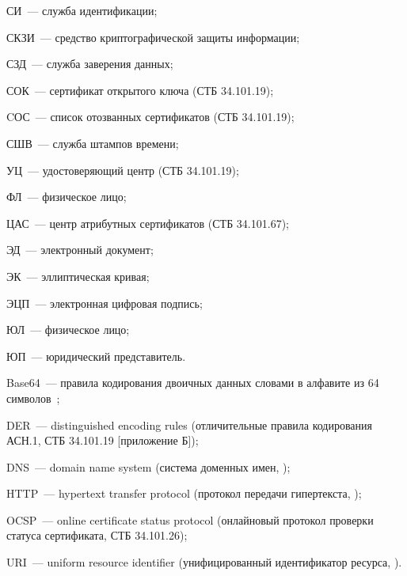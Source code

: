 СИ~--- служба идентификации;

СКЗИ~--- средство криптографической защиты информации;

СЗД~--- служба заверения данных;

СОК~--- сертификат открытого ключа (СТБ 34.101.19);

CОС~--- список отозванных сертификатов (СТБ 34.101.19);

СШВ~--- служба штампов времени;

УЦ~--- удостоверяющий центр (СТБ 34.101.19);

ФЛ~--- физическое лицо;

ЦАС~--- центр атрибутных сертификатов (СТБ 34.101.67);

ЭД~--- электронный документ;

ЭК~--- эллиптическая кривая;

ЭЦП~--- электронная цифровая подпись;

ЮЛ~--- физическое лицо;

ЮП~--- юридический представитель.

Base64~--- правила кодирования двоичных данных словами в алфавите из 64 
символов~\cite{BASE64};

DER~--- distinguished encoding rules (отличительные правила кодирования АСН.1, 
СТБ 34.101.19 [приложение Б]);

DNS~--- domain name system (система доменных имен, \cite{DNS});

HTTP~--- hypertext transfer protocol (протокол передачи гипертекста, 
\cite{HTTP});

OCSP~--- online certificate status protocol (онлайновый протокол проверки 
статуса сертификата, СТБ 34.101.26);

URI~--- uniform resource identifier (унифицированный идентификатор 
ресурса, \cite{URI}).

